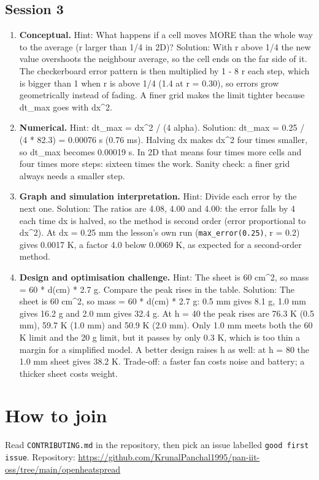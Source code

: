 \documentclass[11pt,a4paper]{article}
\begin{document}
\subsection*{Session 3}
\begin{enumerate}[nosep]
\item \textbf{Conceptual.} Hint: What happens if a cell moves MORE than the whole way to the average (r larger than 1/4 in 2D)? Solution: With r above 1/4 the new value overshoots the neighbour average, so the cell ends on the far side of it. The checkerboard error pattern is then multiplied by \textbar{}1 - 8 r\textbar{} each step, which is bigger than 1 when r is above 1/4 (1.4 at r = 0.30), so errors grow geometrically instead of fading. A finer grid makes the limit tighter because dt\_max goes with dx\textasciicircum{}2.
\item \textbf{Numerical.} Hint: dt\_max = dx\textasciicircum{}2 / (4 alpha). Solution: dt\_max = 0.25 / (4 * 82.3) = 0.00076 s (0.76 ms). Halving dx makes dx\textasciicircum{}2 four times smaller, so dt\_max becomes 0.00019 s. In 2D that means four times more cells and four times more steps: sixteen times the work. Sanity check: a finer grid always needs a smaller step.
\item \textbf{Graph and simulation interpretation.} Hint: Divide each error by the next one. Solution: The ratios are 4.08, 4.00 and 4.00: the error falls by 4 each time dx is halved, so the method is second order (error proportional to dx\textasciicircum{}2). At dx = 0.25 mm the lesson's own run (\texttt{max\_error(0.25)}, r = 0.2) gives 0.0017 K, a factor 4.0 below 0.0069 K, as expected for a second-order method.
\item \textbf{Design and optimisation challenge.} Hint: The sheet is 60 cm\textasciicircum{}2, so mass = 60 * d(cm) * 2.7 g. Compare the peak rises in the table. Solution: The sheet is 60 cm\textasciicircum{}2, so mass = 60 * d(cm) * 2.7 g: 0.5 mm gives 8.1 g, 1.0 mm gives 16.2 g and 2.0 mm gives 32.4 g. At h = 40 the peak rises are 76.3 K (0.5 mm), 59.7 K (1.0 mm) and 50.9 K (2.0 mm). Only 1.0 mm meets both the 60 K limit and the 20 g limit, but it passes by only 0.3 K, which is too thin a margin for a simplified model. A better design raises h as well: at h = 80 the 1.0 mm sheet gives 38.2 K. Trade-off: a faster fan costs noise and battery; a thicker sheet costs weight.
\end{enumerate}

\section{How to join}
Read \texttt{CONTRIBUTING.md} in the repository, then pick an issue labelled \texttt{good first issue}. Repository: \url{https://github.com/KrunalPanchal1995/pan-iit-oss/tree/main/openheatspread}
\end{document}
